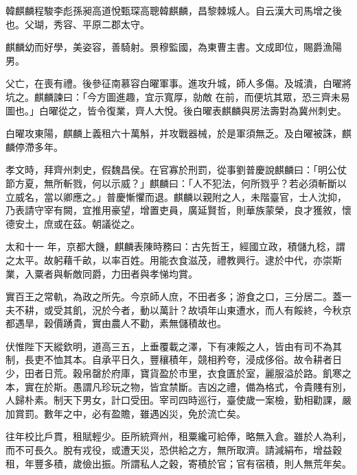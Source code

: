 
\begin{pinyinscope}

 韓麒麟程駿李彪孫昶高道悅甄琛高聰韓麒麟，昌黎棘城人。自云漢大司馬增之後也。父瑚，秀容、平原二郡太守。



 麒麟幼而好學，美姿容，善騎射。景穆監國，為東曹主書。文成即位，賜爵漁陽男。



 父亡，在喪有禮。後參征南慕容白曜軍事。進攻升城，師人多傷。及城潰，白曜將坑之。麒麟諫曰：「今方圖進趣，宜示寬厚，勍敵
 在前，而便坑其眾，恐三齊未易圖也。」白曜從之，皆令復業，齊人大悅。後白曜表麒麟與房法壽對為冀州刺史。



 白曜攻東陽，麒麟上義租六十萬斛，并攻戰器械，於是軍須無乏。及白曜被誅，麒麟停滯多年。



 孝文時，拜齊州刺史，假魏昌侯。在官寡於刑罰，從事劉普慶說麒麟曰：「明公仗節方夏，無所斬戮，何以示威？」麒麟曰：「人不犯法，何所戮乎？若必須斬斷以立威名，當以卿應之。」普慶慚懼而退。麒麟以親附之人，未階臺官，士人沈抑，乃表請守宰有闕，宜推用豪望，增置吏員，廣延賢哲，則華族蒙榮，良才獲敘，懷德安土，庶或在茲。朝議從之。



 太和十一
 年，京都大饑，麒麟表陳時務曰：古先哲王，經國立政，積儲九稔，謂之太平。故躬藉千畝，以率百姓。用能衣食滋茂，禮教興行。逮於中代，亦崇斯業，入粟者與斬敵同爵，力田者與孝悌均賞。



 實百王之常軌，為政之所先。今京師人庶，不田者多；游食之口，三分居二。蓋一夫不耕，或受其飢，況於今者，動以萬計？故頃年山東遭水，而人有餒終，今秋京都遇旱，穀價踴貴，實由農人不勸，素無儲積故也。



 伏惟陛下天縱欽明，道高三五，上垂覆載之澤，下有凍餒之人，皆由有司不為其制，長吏不恤其本。自承平日久，豐穰積年，競相矜夸，浸成侈俗。故令耕者日
 少，田者日荒。穀帛罄於府庫，寶貨盈於市里，衣食匱於室，麗服溢於路。飢寒之本，實在於斯。愚謂凡珍玩之物，皆宜禁斷。吉凶之禮，備為格式，令貴賤有別，人歸朴素。制天下男女，計口受田。宰司四時巡行，臺使歲一案檢，勤相勸課，嚴加賞罰。數年之中，必有盈贍，雖遇凶災，免於流亡矣。



 往年校比戶貫，租賦輕少。臣所統齊州，租粟纔可給俸，略無入倉。雖於人為利，而不可長久。脫有戎役，或遭天災，恐供給之方，無所取濟。請減絹布，增益穀租，年豐多積，歲儉出振。所謂私人之穀，寄積於官；官有宿積，則人無荒年矣。




\end{pinyinscope}
